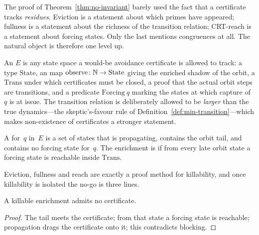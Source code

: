 The proof of Theorem~\ref{thm:no-invariant} barely used the fact that a
certificate tracks \emph{residues}.  Eviction is a statement about which
primes have appeared; fullness is a statement about the richness of the
transition relation; CRT-reach is a statement about forcing states.
Only the last mentions congruences at all.  The natural object is
therefore one level up.

\begin{definition}
\label{def:enrichment}
An  $E$ is any state space a would-be avoidance
certificate is allowed to track: a type $\mathrm{State}$, an
 map $\mathrm{observe} \colon \mathbb{N} \to
\mathrm{State}$ giving the enriched shadow of the orbit, a
 $\mathrm{Trans}$ under which certificates
must be closed, a proof that the actual orbit steps are transitions, and
a predicate $\mathrm{Forcing}\ q$ marking the states at which capture
of~$q$ is at issue.  The transition relation is deliberately allowed to
be \emph{larger} than the true dynamics---the skeptic's-favour rule of
Definition~\ref{def:min-transition}---which makes non-existence of
certificates a stronger statement.
\end{definition}

\begin{definition}
\label{def:certificate}
A  for~$q$ in~$E$ is a set of states that is
propagating, contains the orbit tail, and contains no forcing state
for~$q$.  The enrichment is  if from every late
orbit state a forcing state is reachable inside $\mathrm{Trans}$.
\end{definition}

Eviction, fullness and reach are exactly a proof method for
killability, and once killability is isolated the no-go is three lines.

\begin{theorem}
\label{thm:emptiness}
A killable enrichment admits no certificate.
\end{theorem}

\begin{proof}
The tail meets the certificate; from that state a forcing state is
reachable; propagation drags the certificate onto it; this contradicts
blocking.
\end{proof}

